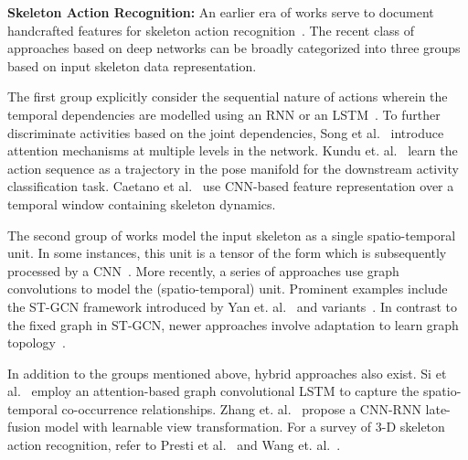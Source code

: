 \documentclass[twocolumn]{svjour3}          \smartqed  \usepackage{graphicx}
\begin{document}
\noindent \textbf{Skeleton Action Recognition:} An earlier era of works serve to document handcrafted features for skeleton action recognition~\cite{Vemulapalli2014HumanAR,wang2012mining,covdesc,halim2016human}. The recent class of approaches based on deep networks can be broadly categorized into three groups based on input skeleton data representation.

The first group explicitly consider the sequential nature of actions wherein the temporal dependencies are modelled using an RNN or an LSTM~\cite{zhang2017view,DBLP:journals/corr/KimR17,DBLP:journals/corr/ZhuLXZLSX16}. To further discriminate activities based on the joint dependencies, Song et al.~\cite{DBLP:journals/corr/SongLXZL16} introduce attention mechanisms at multiple levels in the network. Kundu et. al.~\cite{DBLP:journals/corr/abs-1812-02592} learn the action sequence as a trajectory in the pose manifold for the downstream activity classification task. Caetano et al.~\cite{Caetano:AVSS:2019} use CNN-based feature representation over a temporal window containing skeleton dynamics.

The second group of works model the input skeleton as a single spatio-temporal unit. In some instances, this unit is a tensor of the form  which is subsequently processed by a CNN~\cite{DBLP:journals/corr/LiZXP17,DBLP:journals/corr/LiDCCLH17,7486569,Caetano:SIBGRAPI:2019,HCN}. More recently, a series of approaches use graph convolutions to model the (spatio-temporal) unit. Prominent examples include the ST-GCN framework introduced by Yan et. al.~\cite{stgcn2018aaai} and variants~\cite{Wu_2019_ICCV,song2019richly}. In contrast to the fixed graph in ST-GCN, newer approaches involve adaptation to learn graph topology~\cite{Shi_2019_CVPR,peng2020learning,2sagcn2019cvpr,Si_2019_CVPR,Tang_2018_CVPR}.

In addition to the groups mentioned above, hybrid approaches also exist. Si et al.~\cite{Si_2019_CVPR} employ an attention-based graph convolutional LSTM to capture the spatio-temporal co-occurrence relationships. Zhang et. al.~\cite{zhang2019view} propose a CNN-RNN late-fusion model with learnable view transformation. For a survey of 3-D skeleton action recognition, refer to Presti et al.~\cite{presti20163d} and Wang et. al.~\cite{WANG2018118}.
\end{document}
